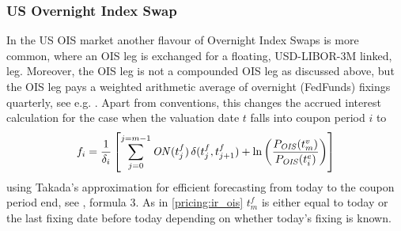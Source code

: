\subsubsection*{US Overnight Index Swap}

In the US OIS market another flavour of Overnight Index Swaps is more common, where
an OIS leg is exchanged for a floating, USD-LIBOR-3M linked, leg. Moreover,
the OIS leg is not a compounded OIS leg as discussed above, but the OIS leg pays
a weighted arithmetic average of overnight (FedFunds) fixings quarterly, 
see e.g. \cite{Takada_2011}. Apart from conventions, this changes the accrued 
interest calculation for the case when the valuation date $t$ falls into coupon
period $i$ to
$$
f_i = \frac{1}{\delta_i} \left[\sum_{j=0}^{j=m-1} \mathit{ON}(t^f_j)\,\delta(t^f_j, t^f_{j+1}) + \ln\left(\frac{P_{\mathit{OIS}}(t^v_m)}{P_{\mathit{OIS}}(t^e_i)}\right) \right]
$$
using Takada's approximation for efficient forecasting from today to the coupon period end, see \cite{Takada_2011},
formula 3. As in \ref{pricing:ir_ois} $t^f_m$ is either equal to today or the last fixing date before today depending on
whether today's fixing is known.
